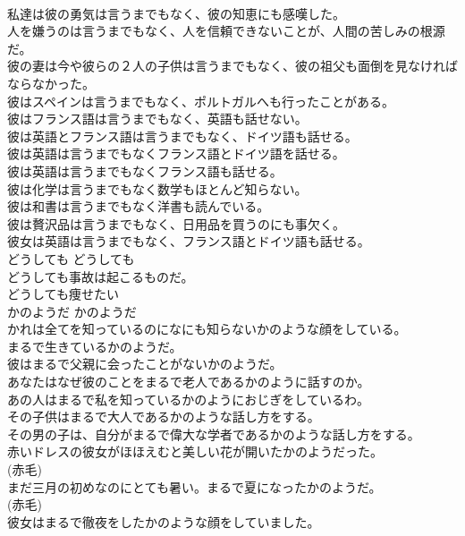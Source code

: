 \documentclass[8pt]{extreport}
\begin{document}
\begin{CJK}{UTF8}{min}
\\	私達は彼の勇気は言うまでもなく、彼の知恵にも感嘆した。   
\\	人を嫌うのは言うまでもなく、人を信頼できないことが、人間の苦しみの根源だ。   
\\	彼の妻は今や彼らの２人の子供は言うまでもなく、彼の祖父も面倒を見なければならなかった。   
\\	彼はスペインは言うまでもなく、ポルトガルへも行ったことがある。   
\\	彼はフランス語は言うまでもなく、英語も話せない。   
\\	彼は英語とフランス語は言うまでもなく、ドイツ語も話せる。   
\\	彼は英語は言うまでもなくフランス語とドイツ語を話せる。   
\\	彼は英語は言うまでもなくフランス語も話せる。   
\\	彼は化学は言うまでもなく数学もほとんど知らない。  
\\	彼は和書は言うまでもなく洋書も読んでいる。   
\\	彼は贅沢品は言うまでもなく、日用品を買うのにも事欠く。   
\\	彼女は英語は言うまでもなく、フランス語とドイツ語も話せる。   
\\	どうしても	どうしても	
\\	どうしても事故は起こるものだ。  
\\	どうしても痩せたい  
\\	かのようだ	かのようだ	
\\	かれは全てを知っているのになにも知らないかのような顔をしている。  
\\	まるで生きているかのようだ。  
\\	彼はまるで父親に会ったことがないかのようだ。   
\\	あなたはなぜ彼のことをまるで老人であるかのように話すのか。   
\\	あの人はまるで私を知っているかのようにおじぎをしているわ。   
\\	その子供はまるで大人であるかのような話し方をする。   
\\	その男の子は、自分がまるで偉大な学者であるかのような話し方をする。   
\\	赤いドレスの彼女がほほえむと美しい花が開いたかのようだった。  
\\	(赤毛)
\\	まだ三月の初めなのにとても暑い。まるで夏になったかのようだ。  
\\	(赤毛)
\\	彼女はまるで徹夜をしたかのような顔をしていました。  

\end{CJK}
\end{document}
